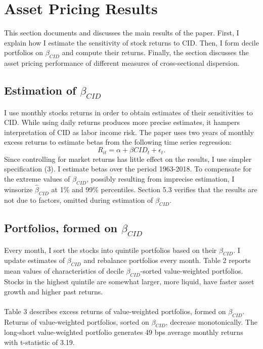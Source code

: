 \documentclass[12pt]{article}
\begin{document}
\section{Asset Pricing Results} \label{sec:Model}

This section documents and discusses the main results of the paper. First, I explain how I estimate the sensitivity of stock returns to CID. Then, I form decile portfolios on $\beta_{CID}$ and compute their returns. Finally, the section discusses the asset pricing performance of different measures of cross-sectional dispersion.

\subsection{Estimation of $\beta_{CID}$}
I use monthly stocks returns in order to obtain estimates of their sensitivities to CID. While using daily returns produces more precise estimates, it hampers interpretation of CID as labor income risk. The paper uses two years of monthly excess returns to estimate betas from the following time series regression:
\begin{equation}
R_{it}=\alpha+\beta CID_t + \epsilon_t.
\end{equation}
Since controlling for market returns has little effect on the results, I use simpler specification (3). I estimate betas over the period 1963-2018. To compensate for the extreme values of $\hat{\beta}_{CID}$, possibly resulting from imprecise estimation, I winsorize $\hat{\beta}_{CID}$ at 1\% and 99\% percentiles. Section 5.3 verifies that the results are not due to factors, omitted during estimation of $\beta_{CID}$.  

\subsection{Portfolios, formed on $\beta_{CID}$}

Every month, I sort the stocks into quintile portfolios based on their $\beta_{CID}$. I update estimates of $\beta_{CID}$ and rebalance portfolios every month. 
Table 2 reports mean values of characteristics of decile $\beta_{CID}$-sorted value-weighted portfolios. Stocks in the highest quintile are somewhat larger, more liquid, have faster asset growth and higher past returns. 
\paragraph{}
Table 3 describes excess returns of value-weighted portfolios, formed on $\beta_{CID}$. Returns of value-weighted portfolios, sorted on $\beta_{CID}$, decrease monotonically. The long-short value-weighted portfolio generates 49 bps average monthly returns with t-statistic of 3.19. 
\end{document}
